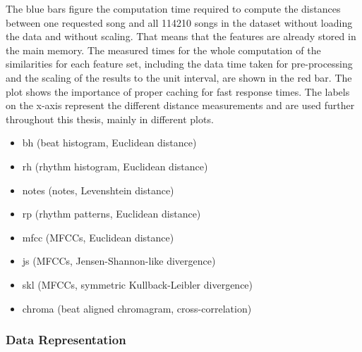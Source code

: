 \noindent The blue bars figure the computation time required to compute the distances between one requested song and all 114210 songs in the dataset without loading the data and without scaling. That means that the features are already stored in the main memory. The measured times for the whole computation of the similarities for each feature set, including the data time taken for pre-processing and the scaling of the results to the unit interval, are shown in the red bar. The plot shows the importance of proper caching for fast response times. 
\noindent The labels on the x-axis represent the different distance measurements and are used further throughout this thesis, mainly in different plots. 

\begin{itemize}
	\setlength\itemsep{-0.5em}
	\item bh (beat histogram, Euclidean distance)
	\item rh (rhythm histogram, Euclidean distance)
	\item notes (notes, Levenshtein distance)
	\item rp (rhythm patterns, Euclidean distance)
	\item mfcc (MFCCs, Euclidean distance)
	\item js (MFCCs, Jensen-Shannon-like divergence)
	\item skl (MFCCs, symmetric Kullback-Leibler divergence)
	\item chroma (beat aligned chromagram, cross-correlation)
\end{itemize}

\subsubsection{Data Representation}

